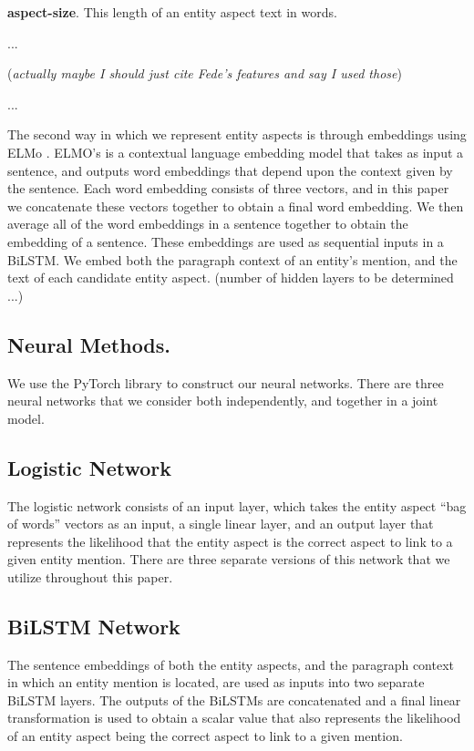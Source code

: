 \documentclass[sigconf,authordraft]{acmart}
\begin{document}
\textbf{aspect-size}. This length of an entity aspect text in words.

... 

(\textit{actually maybe I should just cite Fede's features and say I used those})

...

The second way in which we represent entity aspects is through embeddings using ELMo \cite{elmo}.
ELMO's is a contextual language embedding model that takes as input a sentence, and outputs word embeddings that depend upon the context given by the sentence. Each word embedding consists of three vectors, and in this paper we concatenate these vectors together to obtain a final word embedding. We then average all of the word embeddings in a sentence together to obtain the embedding of a sentence. These embeddings are used as sequential inputs in a BiLSTM. We embed both the paragraph context of an entity's mention, and the text of each candidate entity aspect. (number of hidden layers to be determined ...)

\subsection{Neural Methods.}
We use the PyTorch library \cite{pytorch} to construct our neural networks. There are three neural networks that we consider both independently, and together in a joint model. 

\subsection{Logistic Network}

The logistic network consists of an input layer, which takes the entity aspect ``bag of words'' vectors as an input, a single linear layer, and an output layer that represents the likelihood that the entity aspect is the correct aspect to link to a given entity mention. There are three separate versions of this network that we utilize throughout this paper. 


\subsection{BiLSTM Network}
 The sentence embeddings of both the entity aspects, and the paragraph context in which an entity mention is located, are used as inputs into two separate BiLSTM layers. The outputs of the BiLSTMs are concatenated and a final linear transformation is used to obtain a scalar value that also represents the likelihood of an entity aspect being the correct aspect to link to a given mention.
 
\end{document}

